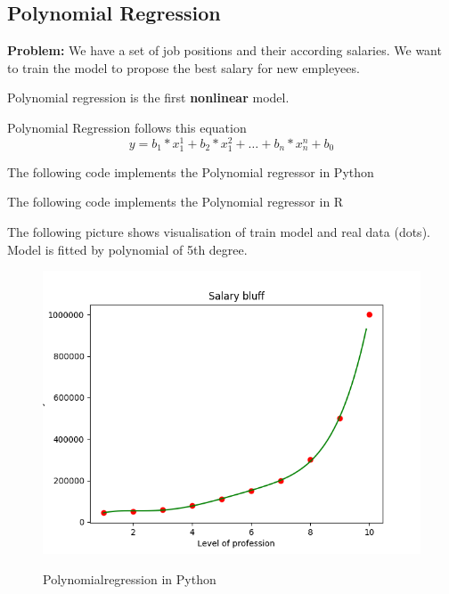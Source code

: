 \documentclass[runningheads,a4paper]{llncs}
\begin{document}
 


\subsection{Polynomial Regression}

\textbf{Problem:} We have a set of job positions and their according salaries. We want to train the model to propose the best salary for new empleyees. 

Polynomial regression is the first \textbf{nonlinear} model.


\bigskip
Polynomial Regression follows this equation
\begin{equation}
y = b_1 * x_1^1 + b_2 * x_1^2 + \dots + b_n * x_n^n + b_0
\end{equation}

\lstset{basicstyle=\large}

The following code implements the Polynomial regressor in Python
 


The following code implements the Polynomial regressor in R
 



The following picture shows visualisation of train model and real data (dots). Model is fitted by polynomial of 5th degree.

\begin{figure}[H]
\centering
\begin{center}
\includegraphics[scale=0.6]{pics/polynomial_regression_python}
\label{uloha1:pic1}
\caption{Polynomialregression in Python} 
\end{center}
\end{figure}
\end{document}
